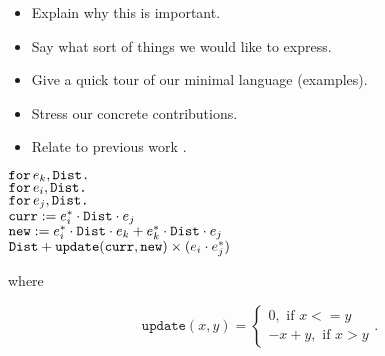 \begin{itemize}
\item Explain why this is important.
\item Say what sort of things we would like to express.
\item Give a quick tour of our minimal language (examples).
\item Stress our concrete contributions.
\item Relate to previous work \cite{matlang,BrijderGBW19,Geerts19,HutchisonHS17}.
\end{itemize}


\noindent
$\texttt{for}\, e_k,\texttt{Dist} \texttt{.}\, $
\\
\hspace*{0.5cm} $\texttt{for}\, e_i,\texttt{Dist} \texttt{.}\, $
\\
\hspace*{1cm} $\texttt{for}\, e_j,\texttt{Dist} \texttt{.}\, $
\\
\hspace*{1.5cm} 
$\texttt{curr} := e_i^*\cdot \texttt{Dist} \cdot e_j$\\
\hspace*{1.5cm} 
$\texttt{new} := e_i^*\cdot \texttt{Dist} \cdot e_k + e_k^*\cdot \texttt{Dist}\cdot e_j$\\
\hspace*{1.5cm}
$\texttt{Dist} + \texttt{update}(\texttt{curr},\texttt{new})\times (e_i\cdot e_j^*)$

where

\[
  			\texttt{update}(x,y)=\begin{cases}
               0, \text{ if } x<=y \\
               -x + y, \text{ if } x > y
            \end{cases}.
		\]
